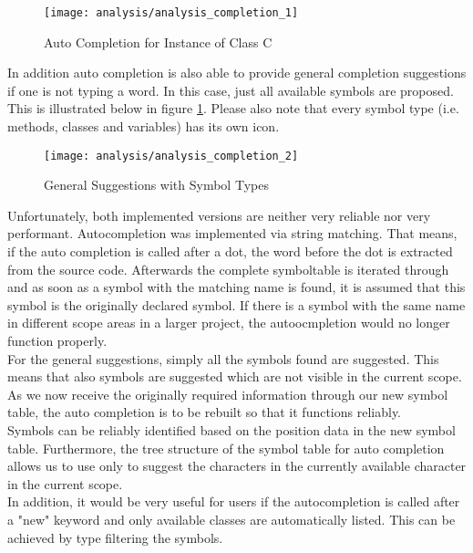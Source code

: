 \begin{figure}[H]
    \centering
    \texttt{[image: analysis/analysis\_completion\_1]}
    \caption{Auto Completion for Instance of Class C}
    \label{fig:analysis_completion_1}
\end{figure}

In addition auto completion is also able to provide general completion suggestions if one is not typing a word. In this case, just all available symbols are proposed. This is illustrated below in figure \ref{fig:analysis_completion_1}. Please also note that every symbol type (i.e. methods, classes and variables) has its own icon.

\begin{figure}[H]
    \centering
    \texttt{[image: analysis/analysis\_completion\_2]}
    \caption{General Suggestions with Symbol Types}
    \label{fig:analysis_completion_2}
\end{figure}

Unfortunately, both implemented versions are neither very reliable nor very performant.
Autocompletion was implemented via string matching.
That means, if the auto completion is called after a dot, the word before the dot is extracted from the source code.
Afterwards the complete symboltable is iterated through and as soon as a symbol with the matching name is found,
it is assumed that this symbol is the originally declared symbol.
If there is a symbol with the same name in different scope areas in a larger project,
the autoocmpletion would no longer function properly. \\

For the general suggestions, simply all the symbols found are suggested.
This means that also symbols are suggested which are not visible in the current scope. \\

As we now receive the originally required information through our new symbol table,
the auto completion is to be rebuilt so that it functions reliably. \\

Symbols can be reliably identified based on the position data in the new symbol table.
Furthermore, the tree structure of the symbol table for auto completion allows us to use only
to suggest the characters in the currently available character in the current scope. \\

In addition, it would be very useful for users if the autocompletion is called after a "new"
keyword and only available classes are automatically listed. This can be achieved by type filtering the symbols.

